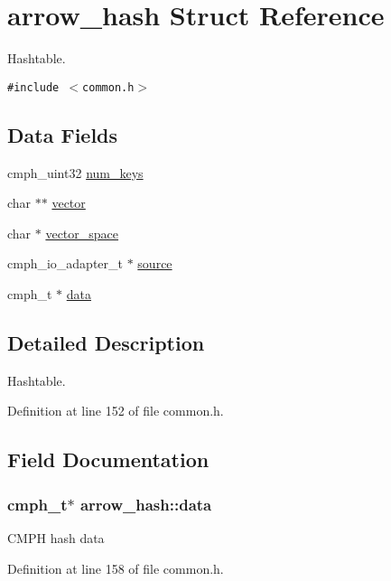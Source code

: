 \hypertarget{structarrow__hash}{
\section{arrow\_\-hash Struct Reference}
\label{structarrow__hash}
}
Hashtable.  


{\tt \#include $<$common.h$>$}

\subsection*{Data Fields}
\begin{CompactItemize}
\item 
cmph\_\-uint32 \hyperlink{structarrow__hash_f75ec1b9382f5b646007f8acb0521c15}{num\_\-keys}
\item 
char $\ast$$\ast$ \hyperlink{structarrow__hash_91eeed74d32d354b4e8b03be8b51f058}{vector}
\item 
char $\ast$ \hyperlink{structarrow__hash_298c5f151d99d62d6be200a620a4b4c3}{vector\_\-space}
\item 
cmph\_\-io\_\-adapter\_\-t $\ast$ \hyperlink{structarrow__hash_202a3f5b2689ae35543ef2c7ea84a6c2}{source}
\item 
cmph\_\-t $\ast$ \hyperlink{structarrow__hash_9f6c6f476d93187dd1436eac92bd8d53}{data}
\end{CompactItemize}


\subsection{Detailed Description}
Hashtable. 

Definition at line 152 of file common.h.

\subsection{Field Documentation}
\hypertarget{structarrow__hash_9f6c6f476d93187dd1436eac92bd8d53}{
\subsubsection[{data}]{\setlength{\rightskip}{0pt plus 5cm}cmph\_\-t$\ast$ {\bf arrow\_\-hash::data}}}
\label{structarrow__hash_9f6c6f476d93187dd1436eac92bd8d53}


CMPH hash data 

Definition at line 158 of file common.h.

